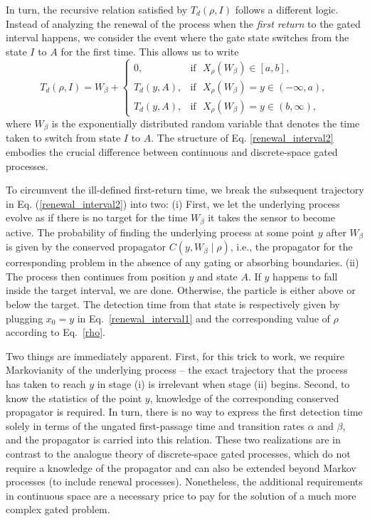 In turn, the recursive relation satisfied by $T_d(\rho,I)$ follows a different logic. Instead of analyzing the renewal of the process when the \textit{first return} to the gated interval happens, we consider the event where the gate state switches from the state $I$ to $A$ for the first time. This allows us to write  
%
\begin{equation}  \label{renewal_interval2}
T_d(\rho,I)= W_\beta +
    \begin{cases}
      0, &\text{if~~} X_{\rho}(W_\beta) \in [a,b], \\
       T_d(y,A), &\text{if~~} X_{\rho}(W_\beta) = y \in (-\infty, a),\\
       T_d(y,A), &\text{if~~} X_{\rho}(W_\beta) = y \in (b, \infty),
    \end{cases}
\end{equation}
%
where $W_\beta$ is the exponentially distributed random variable that denotes the time taken to switch from state $I$ to $A$. The structure of Eq. \eqref{renewal_interval2} embodies the crucial difference between continuous and discrete-space gated processes. 

To circumvent the ill-defined first-return time, we break the subsequent trajectory in Eq. (\ref{renewal_interval2}) into two: (i) First, we let the underlying process evolve as if there is no target for the time $W_\beta$ it takes the sensor to become active. The probability of finding the underlying process at some point $y$ after $W_\beta$ is given by the conserved propagator $C(y, W_\beta \mid \rho)$, i.e., the propagator for the corresponding problem in the absence of any gating or absorbing boundaries. (ii) The process then continues from position $y$ and state $A$. If $y$ happens to fall inside the target interval, we are done. Otherwise, the particle is either above or below the target. The detection time from that state is respectively given by plugging $x_0=y$ in Eq.~\eqref{renewal_interval1} and the corresponding value of $\rho$ according to Eq.~\eqref{rho}.

Two things are immediately apparent. First, for this trick to work, we require Markovianity of the underlying process -- the exact trajectory that the process has taken to reach $y$ in stage (i) is irrelevant when stage (ii) begins. Second, to know the statistics of the point $y$, knowledge of the corresponding conserved propagator is required. In turn, there is no way to express the first detection time solely in terms of the ungated first-passage time and transition rates $\alpha$ and $\beta$, and the propagator is carried into this relation. These two realizations are in contrast to the analogue theory of discrete-space gated processes, which do not require a knowledge of the propagator and can also be extended beyond Markov processes (to include renewal processes). Nonetheless, the additional requirements in continuous space are a necessary price to pay for the solution of a much more complex gated problem.


